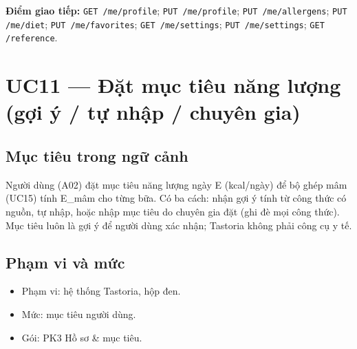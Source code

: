 \textbf{Điểm giao tiếp:} {\small\texttt{GET /\allowbreak{}\allowbreak{}me/\allowbreak{}\allowbreak{}profile}}; {\small\texttt{PUT /\allowbreak{}\allowbreak{}me/\allowbreak{}\allowbreak{}profile}}; {\small\texttt{PUT /\allowbreak{}\allowbreak{}me/\allowbreak{}\allowbreak{}allergens}}; {\small\texttt{PUT /\allowbreak{}\allowbreak{}me/\allowbreak{}\allowbreak{}diet}}; {\small\texttt{PUT /\allowbreak{}\allowbreak{}me/\allowbreak{}\allowbreak{}favorites}}; {\small\texttt{GET /\allowbreak{}\allowbreak{}me/\allowbreak{}\allowbreak{}settings}}; {\small\texttt{PUT /\allowbreak{}\allowbreak{}me/\allowbreak{}\allowbreak{}settings}}; {\small\texttt{GET /\allowbreak{}\allowbreak{}reference}}.

\section{UC11 --- Đặt mục tiêu năng lượng (gợi ý /\allowbreak{} tự nhập /\allowbreak{} chuyên gia)}
\subsection{Mục tiêu trong ngữ cảnh}
Người dùng (A02) đặt mục tiêu năng lượng ngày E (kcal/\allowbreak{}ngày) để bộ ghép mâm (UC15) tính E\_\allowbreak{}mâm cho từng bữa. Có ba cách: nhận gợi ý tính từ công thức có nguồn, tự nhập, hoặc nhập mục tiêu do chuyên gia đặt (ghi đè mọi công thức). Mục tiêu luôn là gợi ý để người dùng xác nhận; Tastoria không phải công cụ y tế.

\subsection{Phạm vi và mức}
\begin{itemize}
\item Phạm vi: hệ thống Tastoria, hộp đen.
\item Mức: mục tiêu người dùng.
\item Gói: PK3 Hồ sơ \& mục tiêu.
\end{itemize}
